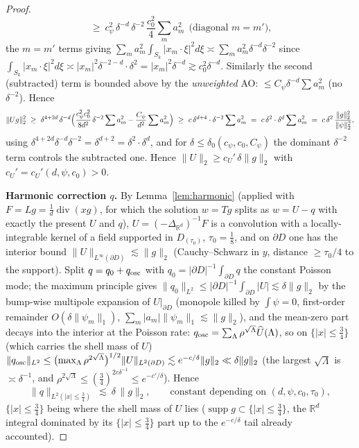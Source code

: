 \documentclass[11pt]{article}
\theoremstyle{remark}
\newcommand{\R}{\mathbb{R}}
\newcommand{\norm}[1]{\lVert #1\rVert}
\newcommand{\abs}[1]{\lvert #1\rvert}
\newcommand{\SET}[1]{\{#1\}}
\DeclareMathOperator{\diver}{div}
\DeclareMathOperator{\supp}{supp}
\begin{document}
\begin{proof}
\[\ \ge\ c_\psi^{2}\,\delta^{-d}\,\delta^{-2}\,\frac{c_0^{2}}{4}\sum_m a_m^{2}
\ \ \bigl(\text{diagonal }m=m'\bigr),
\]
the $m=m'$ terms giving
$\sum_m a_m^{2}\int_{S_k}\abs{x_m\cdot\xi}^{2}d\xi
\asymp\sum_m a_m^{2}\delta^{-d}\delta^{-2}$ since
$\int_{S_k}\abs{x_m\cdot\xi}^{2}d\xi\asymp\abs{x_m}^{2}\delta^{-2-d}\cdot
\delta^{2}=\abs{x_m}^{2}\delta^{-d}\gtrsim c_0^{2}\delta^{-d}$.
Similarly the second (subtracted) term is bounded above by the
\emph{unweighted} AO: $\le C_\psi\delta^{-d}\sum a_m^{2}$ (no
$\delta^{-2}$). Hence
\[
\norm{Ug}_2^{2}
\ \ge\ \delta^{4+2d}\,\delta^{-d}\Bigl(
\frac{c_\psi^{2}c_0^{2}}{8d^{2}}\,\delta^{-2}\sum a_m^{2}
-\frac{C_\psi}{d^{2}}\sum a_m^{2}\Bigr)
\ \ge\ c\,\delta^{d+4}\cdot\delta^{-2}\sum a_m^{2}
\ =\ c\,\delta^{2}\cdot\delta^{d}\sum a_m^{2}
\ =\ c\,\delta^{2}\,\frac{\norm{g}_2^{2}}{\norm{\psi}_2^{2}},
\]
using $\delta^{4+2d}\delta^{-d}\delta^{-2}=\delta^{d+2}
=\delta^{2}\cdot\delta^{d}$, and for $\delta\le\delta_0(c_\psi,c_0,C_\psi)$
the dominant $\delta^{-2}$ term controls the subtracted one. Hence
$\norm{U}_2\ge c_U'\,\delta\norm{g}_2$ with
$c_U'=c_U'(d,\psi,c_0)>0$.

\smallskip
\noindent\textbf{Harmonic correction $q$.} By Lemma~\ref{lem:harmonic}
(applied with $F=Lg=\frac1d\diver(xg)$, for which the solution $w=Tg$
splits as $w=U-q$ with exactly the present $U$ and $q$),
$U=(-\Delta_{\R^d})^{-1}F$ is a convolution with a locally-integrable
kernel of a field supported in $D_{(\tau_0)}$, $\tau_0=\tfrac18$, and on
$\partial D$ one has the interior bound
$\norm{U}_{L^{\infty}(\partial D)}\lesssim\norm g_2$
(Cauchy--Schwarz in $y$, distance $\ge\tau_0/4$ to the support). Split
$q=q_0+q_{\rm osc}$ with $q_0=\abs{\partial D}^{-1}\int_{\partial D}q$ the constant Poisson
mode; the maximum principle gives $\norm{q_0}_{L^{2}}
\le\abs{\partial D}^{-1}\int_{\partial D}\abs U\lesssim\delta\norm g_2$ by the bump-wise
multipole expansion of $U|_{\partial D}$ (monopole killed by
$\int\psi=0$, first-order remainder $O(\delta\norm{\psi_m}_1)$,
$\sum_m\abs{a_m}\norm{\psi_m}_1\lesssim\norm g_2$), and the
mean-zero part decays into the interior at the Poisson rate:
$q_{\rm osc}=\sum_{\Lambda}\rho^{\sqrt\Lambda}\widehat U(\Lambda)$, so
on $\SET{\abs x\le\tfrac34}$ (which carries the shell mass of $U$)
$\norm{q_{\rm osc}}_{L^{2}}\le\bigl(\max_\Lambda
\rho^{2\sqrt\Lambda}\bigr)^{1/2}\norm U_{L^{2}(\partial D)}
\lesssim e^{-c/\delta}\norm g_2\ll\delta\norm g_2$ (the largest
$\sqrt\Lambda$ is $\asymp\delta^{-1}$, and
$\rho^{2\sqrt\Lambda}\le(\frac34)^{2c\delta^{-1}}\le e^{-c'/\delta}$).
Hence
\begin{equation}\label{eq:qbound}
\norm{q}_{L^{2}(\abs x\le\frac34)}\ \lesssim\ \delta\,\norm g_2 ,
\qquad\text{constant depending on }(d,\psi,c_0,\tau_0),
\end{equation}
$\SET{\abs x\le\tfrac34}$ being where the shell mass of $U$ lies
($\supp g\subset\SET{\abs x\le\tfrac34}$, the $\R^d$ integral
dominated by its $\SET{\abs x\le\tfrac34}$ part up to the
$e^{-c/\delta}$ tail already accounted).


\end{proof}
\end{document}
